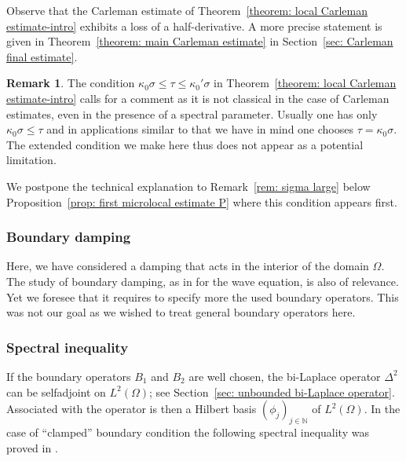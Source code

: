 \documentclass[10pt]{amsart}
\theoremstyle{plain}
\theoremstyle{definition}
\newtheorem{remark}[theorem]{Remark}
\def\N{\mathbb{N}}
\let\k\kappa
\begin{document}
Observe that the Carleman estimate of Theorem~\ref{theorem: local
Carleman estimate-intro} exhibits a loss of a half-derivative. A
more precise statement is given in Theorem~\ref{theorem: main Carleman estimate} in Section~\ref{sec: Carleman final estimate}.

\begin{remark}
The condition $\k_0 \sigma \leq \tau \leq \k_0' \sigma$ in
Theorem~\ref{theorem: local Carleman estimate-intro} calls for a
comment as it is not classical in the case of Carleman estimates,
even in the presence of a spectral parameter. Usually one has only
$\k_0 \sigma \leq \tau$ and in applications similar to that we have
in mind one chooses $\tau = \k_0 \sigma$. The extended condition we
make here thus does not appear as a potential limitation.

We postpone the technical explanation to
Remark~\ref{rem: sigma large} below Proposition~\ref{prop: first microlocal estimate
P} where this condition appears first.
\end{remark}


\subsubsection{Boundary damping}
Here, we have considered a damping that acts in the interior of the
domain $\Omega$. The study of boundary damping, as in \cite{LR:97} for
the wave equation, is also of relevance.
Yet we foresee that it requires to specify more the used boundary
operators. This was not our goal as we wished to treat general
boundary operators here.

\subsubsection{Spectral inequality}
If the boundary operators $B_1$ and $B_2$ are well chosen, the
bi-Laplace operator $\Delta^2$ can be selfadjoint on $L^2(\Omega)$;
see Section~\ref{sec: unbounded bi-Laplace operator}. Associated with
the operator is then a Hilbert basis $(\phi_j)_{j \in \N}$ of
$L^2(\Omega)$. In the case of ``clamped'' boundary condition the
following spectral inequality was proved in \cite{JL}.
\end{document}
